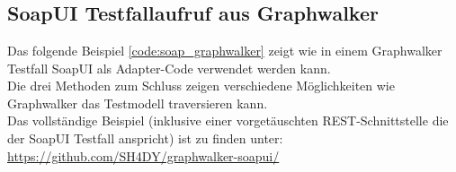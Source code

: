 \chapter{\appendixlabel}

\section{SoapUI Testfallaufruf aus Graphwalker}
\label{app:soap}
Das folgende Beispiel \ref{code:soap_graphwalker} zeigt wie in einem Graphwalker Testfall SoapUI als Adapter-Code verwendet werden kann.\\
Die drei Methoden zum Schluss zeigen verschiedene Möglichkeiten wie Graphwalker das Testmodell traversieren kann.\\
Das vollständige Beispiel (inklusive einer vorgetäuschten REST-Schnittstelle die der SoapUI Testfall anspricht) ist zu finden unter: \url{https://github.com/SH4DY/graphwalker-soapui/}


